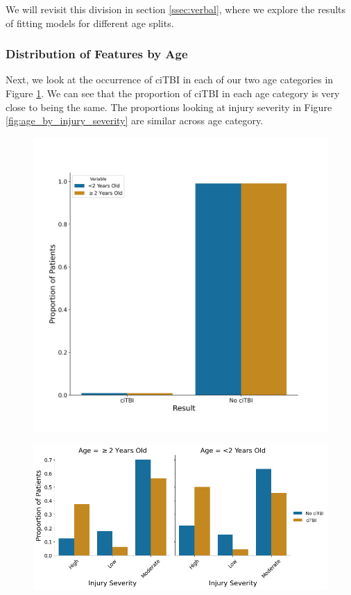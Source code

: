 \documentclass[11pt, letterpaper]{amsart}
\let\Oldsubsubsection\subsubsection
\renewcommand{\subsubsection}{\FloatBarrier\Oldsubsubsection}
\begin{document}
We will revisit this division in section \ref{ssec:verbal}, where we explore the results of fitting models for different age splits. 


\subsubsection{Distribution of Features by Age} \label{sssec:agefeatures}

Next, we look at the occurrence of ciTBI in each of our two age categories in Figure \ref{fig:age_by_outcome}. We can see that the proportion of ciTBI in each age category is very close to being the same. The proportions looking at injury severity in Figure \ref{fig:age_by_injury_severity} are similar across age category.
\begin{figure}
	\begin{minipage}[b]{0.5\linewidth}
		\centering
		\includegraphics[width=\textwidth]{age_comparison_by_group.png}
		\label{fig:age_by_outcome}
	\end{minipage}%
	\begin{minipage}[b]{0.5\linewidth}
		\centering
		\includegraphics[width=\textwidth]{age_by_injuryseverity.png}

\end{minipage}
\end{figure}
\end{document}

